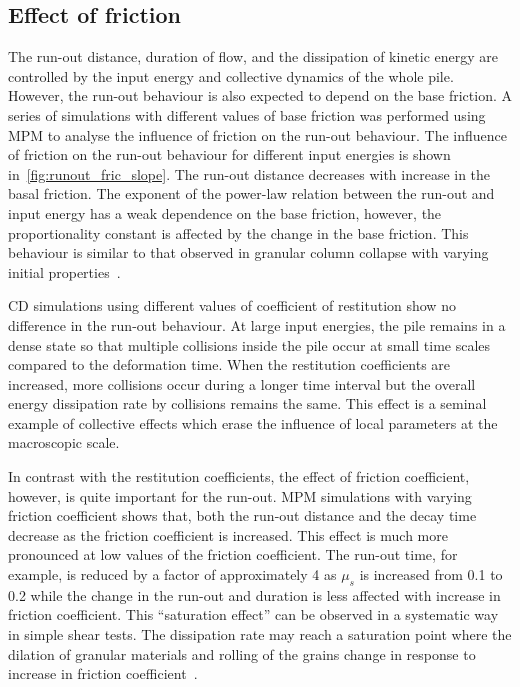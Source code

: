 \subsection{Effect of friction}
\label{sec:parameters}

The run-out distance, duration of flow, and the dissipation of kinetic energy 
are controlled by the input energy and collective dynamics of the whole pile. 
However, the run-out behaviour is also expected to depend on the base friction. 
A series of simulations with different values of base friction was performed 
using MPM to analyse the influence of friction on the run-out behaviour. The 
influence of friction on the run-out behaviour for different input energies is 
shown in~\cref{fig:runout_fric_slope}. The run-out distance decreases with 
increase in the basal friction. The exponent of the 
power-law relation between the run-out and input energy has a weak dependence 
on the base friction, however, the proportionality constant is affected by the 
change in the base friction. This behaviour is similar to that observed in 
granular column collapse with varying initial 
properties~\citep{Balmforth2005,Lajeunesse2005}. 

CD simulations using different values of coefficient of restitution show no 
difference in the run-out behaviour. At large input energies, the pile remains 
in a dense state so that multiple collisions inside the pile occur at small 
time scales compared to the deformation time. When the restitution coefficients 
are increased, more collisions occur during a longer time interval but the 
overall energy dissipation rate by collisions remains the same. This effect is 
a seminal example of collective effects which erase the influence of local 
parameters at the macroscopic scale.

In contrast with the restitution coefficients, the effect of friction 
coefficient, however, is quite important for the run-out. MPM simulations with 
varying friction coefficient shows that, both the run-out distance and the 
decay time decrease as the friction coefficient is increased. This 
effect is much more pronounced at low values of the friction coefficient. 
The run-out time, for example, is reduced by a factor of approximately 4 as 
$\mu_s$ is increased from 0.1 to 0.2 while the change in the run-out and 
duration is 
less affected with increase in friction coefficient. This ``saturation effect'' 
can be observed in a systematic way in simple shear tests. The dissipation rate 
may reach a saturation point where the dilation of granular materials and 
rolling of the grains change in response to increase in friction 
coefficient~\citep{Estrada2008}.

